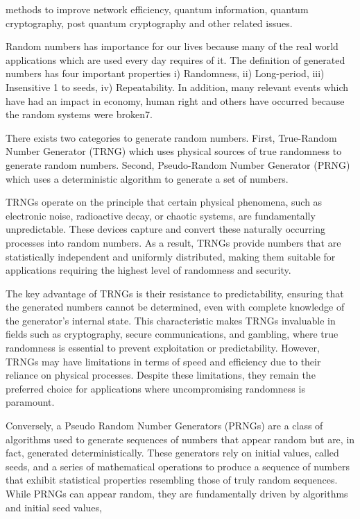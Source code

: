\documentclass[12pt]{article}
\begin{document}
{	methods to improve network efficiency, quantum information, quantum cryptography, post quantum cryptography and other
	related issues.\par
	Random numbers has importance for our lives because many of the real world applications which are used every day
	requires of it. The definition of generated numbers has four important properties i) Randomness, ii) Long-period, iii) Insensitive 1
	to seeds, iv) Repeatability. In addition, many relevant events which have had an impact in economy, human right and others
	have occurred because the random systems were broken7.\par
	There exists two categories to generate random numbers. First, True-Random Number Generator (TRNG) which uses
	physical sources of true randomness to generate random numbers. Second, Pseudo-Random Number Generator (PRNG) which
	uses a deterministic algorithm to generate a set of numbers.\par
	TRNGs operate on the principle that certain physical phenomena, such as electronic noise, radioactive decay, or chaotic
	systems, are fundamentally unpredictable. These devices capture and convert these naturally occurring processes into random
	numbers. As a result, TRNGs provide numbers that are statistically independent and uniformly distributed, making them
	suitable for applications requiring the highest level of randomness and security.\par
	The key advantage of TRNGs is their resistance to predictability, ensuring that the generated numbers cannot be determined,
	even with complete knowledge of the generator’s internal state. This characteristic makes TRNGs invaluable in fields such as
	cryptography, secure communications, and gambling, where true randomness is essential to prevent exploitation or predictability.
	However, TRNGs may have limitations in terms of speed and efficiency due to their reliance on physical processes. Despite
	these limitations, they remain the preferred choice for applications where uncompromising randomness is paramount.\par
	Conversely, a Pseudo Random Number Generators (PRNGs) are a class of algorithms used to generate sequences of
	numbers that appear random but are, in fact, generated deterministically. These generators rely on initial values, called seeds,
	and a series of mathematical operations to produce a sequence of numbers that exhibit statistical properties resembling those of
	truly random sequences. While PRNGs can appear random, they are fundamentally driven by algorithms and initial seed values,
}
\end{document}
